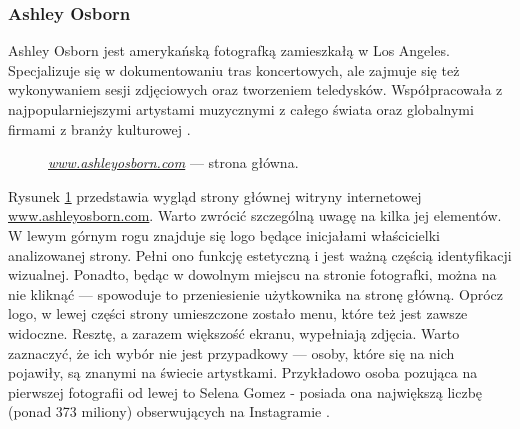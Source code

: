 \documentclass[12pt]{article}
\numberwithin{figure}{section}
\begin{document}
\begin{sloppypar}

\subsubsection{Ashley Osborn} \label{ashley}

Ashley Osborn jest amerykańską fotografką zamieszkałą w Los Angeles. Specjalizuje się w dokumentowaniu tras koncertowych, ale zajmuje się też wykonywaniem sesji zdjęciowych oraz tworzeniem teledysków. Współpracowała z najpopularniejszymi artystami muzycznymi z całego świata oraz globalnymi firmami z branży kulturowej \cite{ashley}. 

\begin{figure}[H] 
    \centering
   \caption{\textit{\url{www.ashleyosborn.com}} --- strona główna.}
   \label{fig:ashley-1.jpg}
\end{figure}

Rysunek \ref{fig:ashley-1.jpg} przedstawia wygląd strony głównej witryny internetowej \url{www.ashleyosborn.com}. Warto zwrócić szczególną uwagę na kilka jej elementów. W lewym górnym rogu znajduje się logo będące inicjałami właścicielki analizowanej strony. Pełni ono funkcję estetyczną i jest ważną częścią identyfikacji wizualnej. Ponadto, będąc w dowolnym miejscu na stronie fotografki, można na nie kliknąć --- spowoduje to przeniesienie użytkownika na stronę główną. Oprócz logo, w lewej części strony umieszczone zostało menu, które też jest zawsze widoczne. Resztę, a zarazem większość ekranu, wypełniają zdjęcia. Warto zaznaczyć, że ich wybór nie jest przypadkowy --- osoby, które się na nich pojawiły, są znanymi na świecie artystkami. Przykładowo osoba pozująca na pierwszej fotografii od lewej to Selena Gomez - posiada ona największą liczbę (ponad 373 miliony) obserwujących na Instagramie \cite{instagram}. 


\end{sloppypar}
\end{document}
